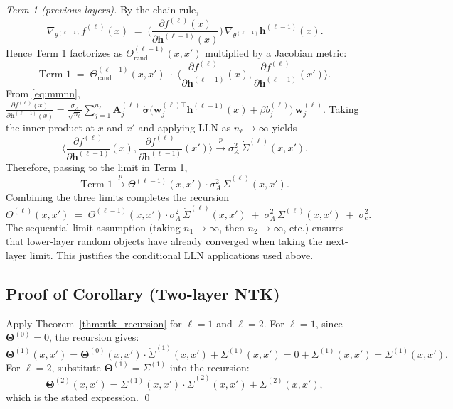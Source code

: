 \documentclass{article}
\DeclareRobustCommand{\ReLU}{\mathrel{\boldsymbol{\sigma}}}
\newcommand{\Kop}{\boldsymbol{\Theta}}
\begin{document}
\emph{Term 1 (previous layers).} By the chain rule,
\[
\nabla_{\theta^{(\ell-1)}} f^{(\ell)}(x) \;=\; \Big(\frac{\partial f^{(\ell)}(x)}{\partial \bm{h}^{(\ell-1)}(x)}\Big)\,\nabla_{\theta^{(\ell-1)}} \bm{h}^{(\ell-1)}(x).
\]
Hence Term 1 factorizes as $\Theta^{(\ell-1)}_{\mathrm{rand}}(x,x')$ multiplied by a Jacobian metric:
\[
\text{Term 1} \;=\; \Theta^{(\ell-1)}_{\mathrm{rand}}(x,x')\;\cdot\;\Big\langle \frac{\partial f^{(\ell)}}{\partial \bm{h}^{(\ell-1)}}(x), \frac{\partial f^{(\ell)}}{\partial \bm{h}^{(\ell-1)}}(x') \Big\rangle.
\]
From \eqref{eq:mmnn}, $\frac{\partial f^{(\ell)}(x)}{\partial \bm{h}^{(\ell-1)}(x)} = \frac{\sigma_A}{\sqrt{n_\ell}}\sum_{j=1}^{n_\ell}\bm{A}^{(\ell)}_j\,\dot{\ReLU}\!\big(\bm{w}^{(\ell)\top}_j\bm{h}^{(\ell-1)}(x)+\beta b^{(\ell)}_j\big)\,\bm{w}^{(\ell)}_j$. Taking the inner product at $x$ and $x'$ and applying LLN as $n_\ell\to\infty$ yields
\[
\Big\langle \frac{\partial f^{(\ell)}}{\partial \bm{h}^{(\ell-1)}}(x), \frac{\partial f^{(\ell)}}{\partial \bm{h}^{(\ell-1)}}(x') \Big\rangle \xrightarrow{p} \sigma_A^2\,\dot{\Sigma}^{(\ell)}(x,x').
\]
Therefore, passing to the limit in Term 1,
\[
\text{Term 1} \xrightarrow{p} \Theta^{(\ell-1)}(x,x')\cdot \sigma_A^2\,\dot{\Sigma}^{(\ell)}(x,x').
\]
Combining the three limits completes the recursion
\[
\Theta^{(\ell)}(x,x') \;=\; \Theta^{(\ell-1)}(x,x')\cdot\sigma_A^2\,\dot{\Sigma}^{(\ell)}(x,x') \;+\; \sigma_A^2\,\Sigma^{(\ell)}(x,x') \;+\; \sigma_c^2.
\]
The sequential limit assumption (taking $n_1\to\infty$, then $n_2\to\infty$, etc.) ensures that lower-layer random objects have already converged when taking the next-layer limit. This justifies the conditional LLN applications used above.

\vspace{1em}
\subsection{Proof of Corollary (Two-layer NTK)}\label{appendix:proof-2layer}
Apply Theorem~\ref{thm:ntk_recursion} for \( \ell=1 \) and \( \ell=2 \). For \( \ell=1 \), since \( \Kop^{(0)}=0 \), the recursion gives:
\[
\Kop^{(1)}(x,x') = \Kop^{(0)}(x,x')\cdot\dot{\Sigma}^{(1)}(x,x') + \Sigma^{(1)}(x,x') = 0 + \Sigma^{(1)}(x,x') = \Sigma^{(1)}(x,x').
\]
For \( \ell=2 \), substitute \( \Kop^{(1)} = \Sigma^{(1)} \) into the recursion:
\[
\Kop^{(2)}(x,x') = \Sigma^{(1)}(x,x')\cdot\dot{\Sigma}^{(2)}(x,x') + \Sigma^{(2)}(x,x'),
\]
which is the stated expression. \qed

\vspace{1em}
\end{document}
